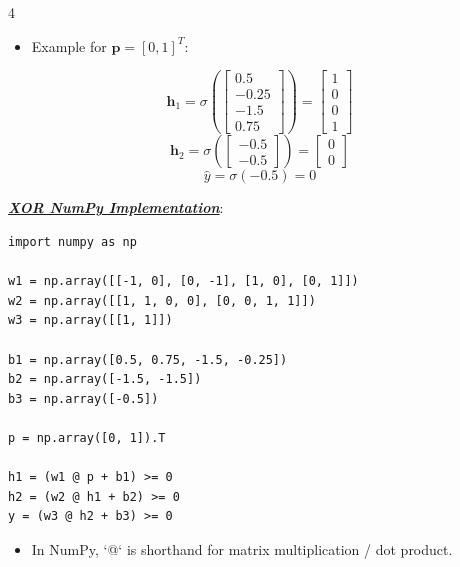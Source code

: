 \documentclass[12pt]{article}
\newcommand{\bulletPoint}[1]{\ul{\textit{\textbf{#1}}}}
\begin{document}
\begin{multicols*}{4}
\begin{itemize}
\item Example for $\mathbf{p}=[0,1]^T$:
\end{itemize}
\useshortskip
\begin{equation*}
    \mathbf{h}_1=\sigma\!\left(
    \begin{bmatrix}
    0.5\\-0.25\\-1.5\\0.75
    \end{bmatrix}\right)
    =
    \begin{bmatrix}
    1\\0\\0\\1
    \end{bmatrix}
\end{equation*}
\useshortskip
\begin{equation*}
    \mathbf{h}_2=\sigma\!\left(
    \begin{bmatrix}
    -0.5\\-0.5
    \end{bmatrix}\right)
    =
    \begin{bmatrix}
    0\\0
    \end{bmatrix}
\end{equation*}
\useshortskip
\begin{equation*}
    \hat{y}=\sigma(-0.5)=0
\end{equation*}

\bulletPoint{XOR NumPy Implementation}:
\begin{lstlisting}
import numpy as np

w1 = np.array([[-1, 0], [0, -1], [1, 0], [0, 1]])
w2 = np.array([[1, 1, 0, 0], [0, 0, 1, 1]])
w3 = np.array([[1, 1]])

b1 = np.array([0.5, 0.75, -1.5, -0.25])
b2 = np.array([-1.5, -1.5])
b3 = np.array([-0.5])

p = np.array([0, 1]).T

h1 = (w1 @ p + b1) >= 0
h2 = (w2 @ h1 + b2) >= 0
y = (w3 @ h2 + b3) >= 0
\end{lstlisting}
\begin{itemize}
\item In NumPy, `@` is shorthand for matrix multiplication / dot product.
\end{itemize}


\end{multicols*}
\end{document}
